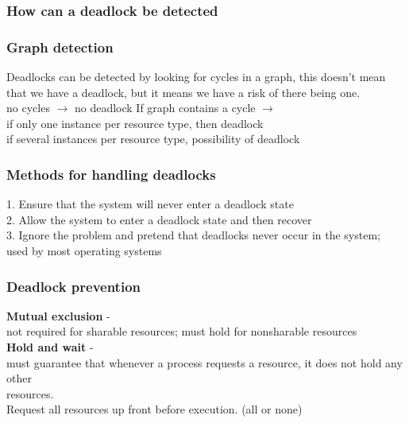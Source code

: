 \documentclass[a4paper,10pt,titlepage]{report}
\begin{document}
\subsubsection{How can a deadlock be detected}

\subsubsection{Graph detection}
Deadlocks can be detected by looking for cycles in a graph, this doesn't mean that we have a deadlock, but it means we have a risk of there being one.\\
no cycles  $\rightarrow $ no deadlock
If graph contains a cycle $\rightarrow $ \\
\hspace{10mm} if only one instance per resource type, then deadlock
\\
\hspace{10mm} if several instances per resource type, possibility of deadlock

\subsubsection{Methods for handling deadlocks}
1. Ensure that the system will never enter a deadlock state\\
2. Allow the system to enter a deadlock state and then recover\\
3. Ignore the problem and pretend that deadlocks never occur in the system; \\
\hspace{10mm} used by most operating systems
\subsubsection{Deadlock prevention}
\textbf{Mutual exclusion }- 
\\ 
\hspace{10mm} not required for sharable resources; must hold for
nonsharable resources
\\
\textbf{Hold and wait} - \\
\hspace{10mm}
must guarantee that whenever a process requests a resource, it does not
hold any other \\
\hspace{10mm} resources.
\\
\hspace{10mm}
Request all resources up front before execution. (all or none)\\
\end{document}

